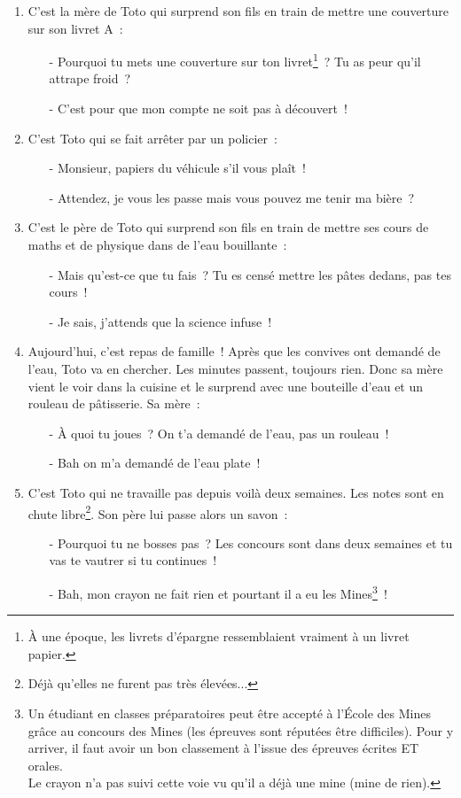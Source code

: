 \documentclass[10pt,a5paper,fullpage]{book}
\begin{document}
\begin{enumerate}
		\item C’est la mère de Toto qui surprend son fils en train de mettre une couverture sur son livret A~:
		\begin{itemize}
			\item[-] Pourquoi tu mets une couverture sur ton livret\footnote{À une époque, les livrets d'épargne ressemblaient vraiment à un livret papier.}~? Tu as peur qu'il attrape froid~?
			\item[-] C’est pour que mon compte ne soit pas à découvert~!
		\end{itemize}
		
		\item C’est Toto qui se fait arrêter par un policier~:
		\begin{itemize}
			\item[-] Monsieur, papiers du véhicule s'il vous plaît~!
			\item[-] Attendez, je vous les passe mais vous pouvez me tenir ma bière~?
		\end{itemize}
		
		\item C’est le père de Toto qui surprend son fils en train de mettre ses cours de maths et de physique dans de l’eau bouillante~:
		\begin{itemize}
			\item[-] Mais qu’est-ce que tu fais~? Tu es censé mettre les pâtes dedans, pas tes cours~!
			\item[-] Je sais, j’attends que la science infuse~!
		\end{itemize}
		
		\item Aujourd’hui, c’est repas de famille~! Après que les convives ont demandé de l’eau, Toto va en chercher. Les minutes passent, toujours rien. Donc sa mère vient le voir dans la cuisine et le surprend avec une bouteille d’eau et un rouleau de pâtisserie. Sa mère~:  
		\begin{itemize}
			\item[-] À quoi tu joues~? On t'a demandé de l'eau, pas un rouleau~!
			\item[-] Bah on m’a demandé de l’eau plate~!
		\end{itemize}
		
		\item C’est Toto qui ne travaille pas depuis voilà deux semaines. Les notes sont en chute libre\footnote{Déjà qu'elles ne furent pas très élevées...}. Son père lui passe alors un savon~:
		\begin{itemize}
			\item[-] Pourquoi tu ne bosses pas~? Les concours sont dans deux semaines et tu vas te vautrer si tu continues~!
			\item[-] Bah, mon crayon ne fait rien et pourtant il a eu les Mines\footnote{Un étudiant en classes préparatoires peut être accepté à l'École des Mines grâce au concours des Mines (les épreuves sont réputées être difficiles). Pour y arriver, il faut avoir un bon classement à l'issue des épreuves écrites ET orales. \\Le crayon n'a pas suivi cette voie vu qu'il a déjà une mine (mine de rien).}~!
		\end{itemize}
		

\end{enumerate}
\end{document}
